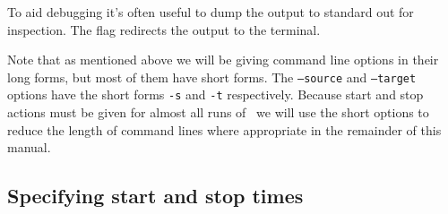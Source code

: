 
\ifDeveloperVersion
To aid debugging it's often useful to dump the output to standard
out for inspection. The  flag redirects the
output to the terminal.
\else
\fi


Note that as mentioned above we will be giving command line options in
their long forms, but most of them have short forms. The
\texttt{--source} and \texttt{--target} options have the short forms
\texttt{-s} and \texttt{-t} respectively. Because start and stop
actions must be given for almost all runs of \ipc\ we will use the
short options to reduce the length of command lines where appropriate
in the remainder of this manual.




\subsection{Specifying start and stop times}

